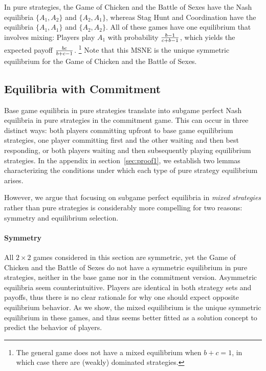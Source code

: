 \documentclass[../paper.tex]{subfiles}
\begin{document}
In pure strategies, the Game of Chicken and the Battle of Sexes have the Nash equilibria $\{A_1,A_2\}$ and $\{A_2,A_1\}$, whereas Stag Hunt and Coordination have the equilibria $\{A_1,A_1\}$ and $\{A_2,A_2\}$. All of these games have one equilibrium that involves mixing: Players play $A_1$ with probability $\frac{b-1}{c+b-1}$, which yields the expected payoff $\frac{bc}{b+c-1}$. \footnote{The general game does not have a mixed equilibrium when $b+c=1$, in which case there are (weakly) dominated strategies.} Note that this MSNE is the unique symmetric equilibrium for the Game of Chicken and the Battle of Sexes.

\subsection*{\centering  Equilibria with Commitment}
Base game equilibria in pure strategies translate into subgame perfect Nash equilibria in pure strategies in the commitment game. This can occur in three distinct ways: both players committing upfront to base game equilibrium strategies, one player committing first and the other waiting and then best responding, or both players waiting and then subsequently playing equilibrium strategies. In the appendix in section~\ref{sec:proof1}, we establish two lemmas characterizing the conditions under which each type of pure strategy equilibrium arises. 
 
However, we argue that focusing on subgame perfect equilibria in \textit{mixed strategies} rather than pure strategies is considerably more compelling for two reasons: symmetry and equilibrium selection.
\paragraph{Symmetry} All $2\times2$ games considered in this section are symmetric, yet the Game of Chicken and the Battle of Sexes do not have a symmetric equilibrium in pure strategies, neither in the base game nor in the commitment version. Asymmetric equilibria seem counterintuitive. Players are identical in both strategy sets and payoffs, thus there is no clear rationale for why one should expect opposite equilibrium behavior. As we show, the mixed equilibrium is the unique symmetric equilibrium in these games, and thus seems better fitted as a solution concept to predict the behavior of players.
 
\end{document}
